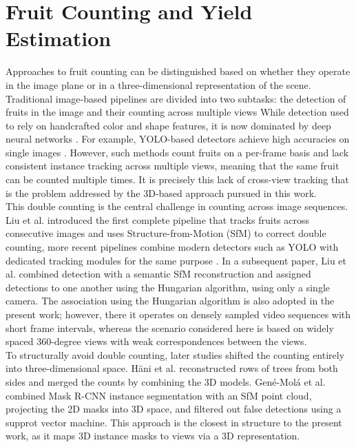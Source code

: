 \documentclass[english, egger, bsc]{vcethesis}
\begin{document}
\section{Fruit Counting and Yield Estimation}
Approaches to fruit counting can be distinguished based on whether they operate in the image plane or in a three-dimensional representation of the scene.
Traditional image-based pipelines are divided into two subtasks: the detection of fruits in the image and their counting across multiple views \cite{haeni2019}
While detection used to rely on handcrafted color and shape features, it is now dominated by deep neural networks \cite{miranda2023}.
For example, YOLO-based detectors achieve high accuracies on single images \cite{ballenaruiz2025}.
However, such methods count fruits on a per-frame basis and lack consistent instance tracking across multiple views, meaning that the same fruit can be counted multiple times.
It is precisely this lack of cross-view tracking that is the problem addressed by the 3D-based approach pursued in this work.
\\ This double counting is the central challenge in counting across image sequences. Liu et al. \cite{liu2018} introduced the first complete pipeline that tracks fruits across consecutive images and uses Structure-from-Motion (SfM) to correct double counting,
more recent pipelines combine modern detectors such as YOLO with dedicated tracking modules for the same purpose \cite{rameshchandra2025}.
In a subsequent paper, Liu et al. \cite{liu2019} combined detection with a semantic SfM reconstruction and assigned detections to one another using the Hungarian algorithm, using only a single camera.
The association using the Hungarian algorithm is also adopted in the present work; however, there it operates on densely sampled video sequences with short frame intervals, whereas the scenario considered here is based on widely spaced 360-degree views with weak correspondences between the views.
\\ To structurally avoid double counting, later studies shifted the counting entirely into three-dimensional space. 
Häni et al. \cite{haeni2019} reconstructed rows of trees from both sides and merged the counts by combining the 3D models.
Gené-Molá et al. \cite{genemola2020} combined Mask R-CNN instance segmentation with an SfM point cloud, projecting the 2D masks into 3D space, and filtered out false detections using a supprot vector machine. 
This approach is the closest in structure to the present work, as it maps 3D instance masks to views via a 3D representation. 
\end{document}
